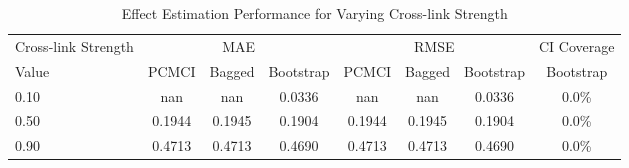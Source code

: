 \begin{table}[htbp]
\centering
\caption{Effect Estimation Performance for Varying Cross-link Strength}
\label{tab:cross_performance}
\begin{tabular}{l|ccc|ccc|c}
\hline
Cross-link Strength & \multicolumn{3}{c|}{MAE} & \multicolumn{3}{c|}{RMSE} & CI Coverage \\
 Value & PCMCI & Bagged & Bootstrap & PCMCI & Bagged & Bootstrap & Bootstrap \\
\hline
0.10 & nan & nan & 0.0336 & nan & nan & 0.0336 & 0.0\% \\
0.50 & 0.1944 & 0.1945 & 0.1904 & 0.1944 & 0.1945 & 0.1904 & 0.0\% \\
0.90 & 0.4713 & 0.4713 & 0.4690 & 0.4713 & 0.4713 & 0.4690 & 0.0\% \\
\hline
\end{tabular}
\end{table}
